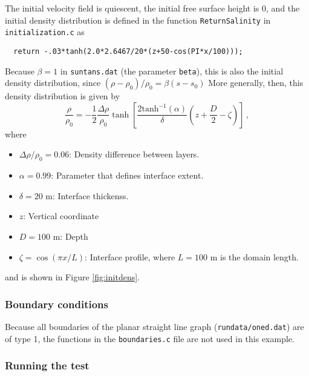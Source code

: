 The initial velocity field is quiescent, the initial free surface height is 0,
and the initial density distribution is defined in the function \verb+ReturnSalinity+
in \verb+initialization.c+ as
\begin{verbatim}
  return -.03*tanh(2.0*2.6467/20*(z+50-cos(PI*x/100)));
\end{verbatim}
Because $\beta=1$ in \verb+suntans.dat+ (the parameter \verb+beta+), this is also the initial density 
distribution, since $(\rho-\rho_0)/\rho_0 = \beta(s-s_0)$ More generally, then, 
this density distribution is given by
\[
\frac{\rho}{\rho_0} = -\frac{1}{2}\frac{\Delta\rho}{\rho_0}
\tanh\left[\frac{2\mbox{tanh}^{-1}(\alpha)}{\delta}\left(z+\frac{D}{2}-\zeta\right)\right]\,,
\]
where
\begin{itemize}
\item $\Delta\rho/\rho_0=0.06$: Density difference between layers.
\item $\alpha=0.99$: Parameter that defines interface extent.
\item $\delta=20$ m: Interface thickenss.
\item $z$: Vertical coordinate
\item $D=100$ m: Depth
\item $\zeta = \cos(\pi x/L)$: Interface profile, where $L=100$ m is the domain length.
\end{itemize}
and is shown in Figure \ref{fig:initdens}. 

\subsubsection{Boundary conditions}

Because all boundaries of the planar
straight line graph (\verb+rundata/oned.dat+) are of type 1, the functions in the \verb+boundaries.c+ file are
not used in this example.

\subsubsection{Running the test}

